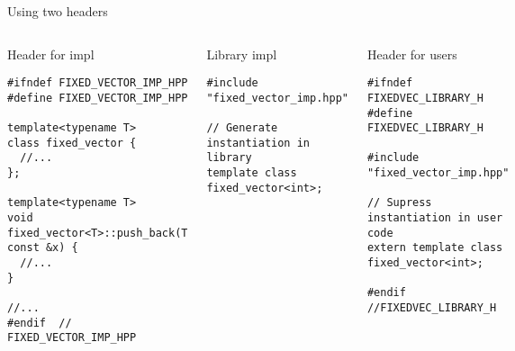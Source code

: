\begin{frame}[t,fragile]{Using two headers}

\begin{columns}[T]

\begin{block}{Header for impl}
\begin{lstlisting}[basicstyle=\tiny]
#ifndef FIXED_VECTOR_IMP_HPP
#define FIXED_VECTOR_IMP_HPP

template<typename T>
class fixed_vector {
  //...
};

template<typename T>
void 
fixed_vector<T>::push_back(T const &x) {
  //...
}

//...
#endif  // FIXED_VECTOR_IMP_HPP

\end{lstlisting}
\end{block}

\begin{block}{Library impl}
\begin{lstlisting}[basicstyle=\tiny]
#include "fixed_vector_imp.hpp"

// Generate instantiation in library
template class fixed_vector<int>;
\end{lstlisting}
\end{block}

\begin{block}{Header for users}
\begin{lstlisting}[basicstyle=\tiny]
#ifndef FIXEDVEC_LIBRARY_H
#define FIXEDVEC_LIBRARY_H

#include "fixed_vector_imp.hpp"

// Supress instantiation in user code
extern template class fixed_vector<int>;

#endif //FIXEDVEC_LIBRARY_H
\end{lstlisting}
\end{block}

\end{columns}
\end{frame}

